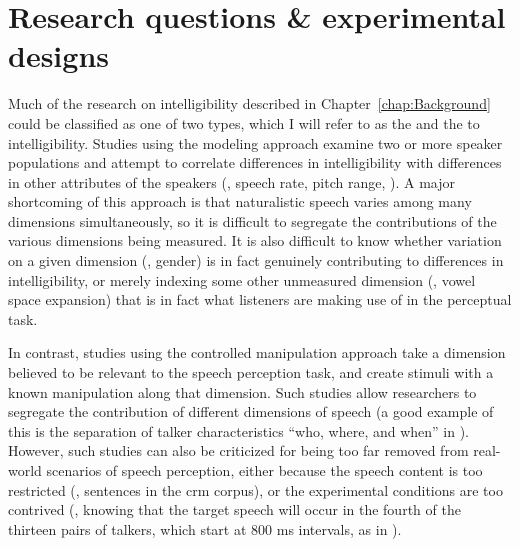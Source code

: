 \chapter{Research questions \& experimental designs\label{chap:Questions}}

Much of the research on intelligibility described in Chapter~\ref{chap:Background} could be classified as one of two types, which I will refer to as the  and the  to intelligibility.  Studies using the modeling approach examine two or more speaker populations and attempt to correlate differences in intelligibility with differences in other attributes of the speakers (\eg, speech rate, pitch range, \etc).\footnotemark{}  A major shortcoming of this approach is that naturalistic speech varies among many dimensions simultaneously, so it is difficult to segregate the contributions of the various dimensions being measured.  It is also difficult to know whether variation on a given dimension (\eg, gender) is in fact genuinely contributing to differences in intelligibility, or merely indexing some other unmeasured dimension (\eg, vowel space expansion) that is in fact what listeners are making use of in the perceptual task.


In contrast, studies using the controlled manipulation approach take a dimension believed to be relevant to the speech perception task, and create stimuli with a known manipulation along that dimension.\footnotemark{}  Such studies allow researchers to segregate the contribution of different dimensions of speech (a good example of this is the separation of talker characteristics “who, where, and when” in \citealt{KitterickEtAl2010}).  However, such studies can also be criticized for being too far removed from real-world scenarios of speech perception, either because the speech content is too restricted (\ie, sentences in the \ac{crm} corpus), or the experimental conditions are too contrived (\eg, knowing that the target speech will occur in the fourth of the thirteen pairs of talkers, which start at 800 ms intervals, as in \citealt{KitterickEtAl2010}).


